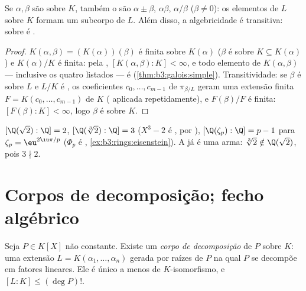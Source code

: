 \begin{corollary}\label{cor:b3:galois:algclosed}
Se $\alpha, \beta$ são  sobre $K$, também o são $\alpha \pm
\beta$, $\alpha\beta$, $\alpha/\beta$
($\beta \ne 0$): os elementos de $L$  sobre $K$ formam um
subcorpo de $L$. Além disso, a algebricidade é transitiva: 
sobre  é .
\end{corollary}

\begin{proof}
$K(\alpha, \beta) = (K(\alpha))(\beta)$ é finita sobre $K(\alpha)$ ($\beta$ é  sobre $K \subseteq K(\alpha)$) e
$K(\alpha)/K$ é finita: pela , $[K(\alpha,\beta):K] <
\infty$, e todo elemento de $K(\alpha, \beta)$ ---
inclusive os quatro listados --- é  (\cref{thm:b3:galois:simple}).
Transitividade: se $\beta$ é  sobre $L$ e $L/K$ é
, os coeficientes $c_0, \dots, c_{m-1}$ de $\pi_{\beta/L}$ geram uma extensão finita
$F = K(c_0, \dots,
c_{m-1})$ de $K$ ( aplicada repetidamente), e $F(\beta)/F$ é
finita: $[F(\beta):K] < \infty$, logo $\beta$ é  sobre $K$.
\end{proof}

\begin{example}\label{ex:b3:galois:degrees}
$[\Q(\sqrt2):\Q] = 2$, $[\Q(\sqrt[3]2):\Q] = 3$ ($X^3 - 2$ é , por ), $[\Q(\zeta_p):\Q] = p - 1$ para $\zeta_p = \eu^{2\iu\pi/p}$
($\Phi_p$ é , \cref{ex:b3:rings:eisenstein}). A  já é uma
arma: $\sqrt[3]2 \notin \Q(\sqrt2)$, pois $3 \nmid 2$.
\end{example}

\section{Corpos de decomposição; fecho algébrico}

\begin{theorem}\label{thm:b3:galois:splitting}
Seja $P \in K[X]$ não constante. Existe um \emph{corpo de
decomposição} de $P$ sobre $K$:
uma extensão $L =
K(\alpha_1, \dots, \alpha_n)$ gerada por raízes de $P$ na qual $P$ se
decompõe em fatores lineares. Ele é único a menos de
$K$-isomorfismo, e $[L:K] \leq (\deg P)!$.
\end{theorem}

